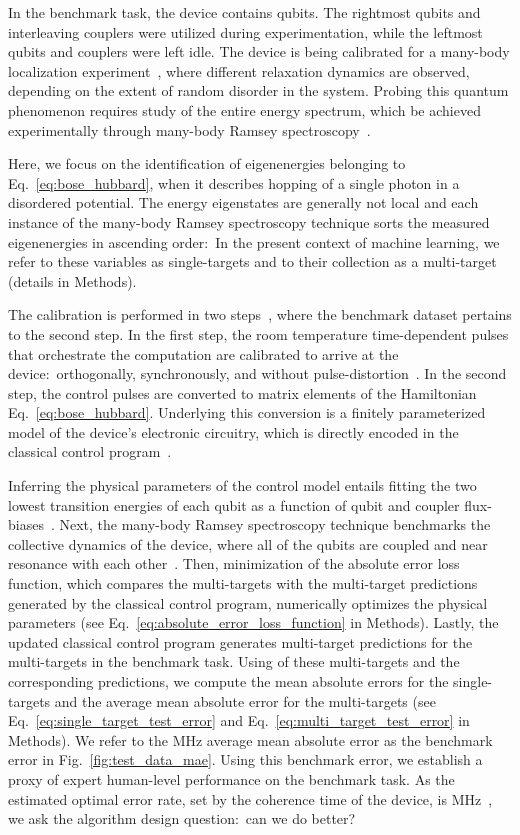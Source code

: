 \documentclass[aps,twocolumn,superscriptaddress,floatfix,preprintnumbers,showkeys]{revtex4}
\begin{document}
In the benchmark task, the device contains  qubits. The  rightmost qubits and  interleaving couplers were utilized during experimentation, while the  leftmost qubits and couplers were left idle. The device is being calibrated for a many-body localization experiment~\cite{Roushan_2017, Chiaro_2019}, where different relaxation dynamics are observed, depending on the extent of random disorder in the system. Probing this quantum phenomenon requires study of the entire energy spectrum, which be achieved experimentally through many-body Ramsey spectroscopy~\cite{Roushan_2017}. 

Here, we focus on the identification of  eigenenergies belonging to Eq.~\ref{eq:bose_hubbard}, when it describes hopping of a single photon in a disordered potential. The energy eigenstates are generally not local and each instance of the many-body Ramsey spectroscopy technique sorts the measured eigenenergies in ascending order:\  In the present context of machine learning, we refer to these variables as single-targets and to their collection as a multi-target (details in Methods). 

The calibration is performed in two steps~\cite{Roushan_2017, Neill_2018, Chiaro_2019}, where the benchmark dataset pertains to the second step. In the first step, the room temperature time-dependent pulses that orchestrate the computation are calibrated to arrive at the device:\ orthogonally, synchronously, and without pulse-distortion~\cite{Neill_2018}. In the second step, the control pulses are converted to matrix elements of the Hamiltonian Eq.~\ref{eq:bose_hubbard}. Underlying this conversion is a finitely parameterized model of the device's electronic circuitry, which is directly encoded in the classical control program~\cite{Roushan_2017, Neill_2018, Chiaro_2019}. 

Inferring the physical parameters of the control model entails fitting the two lowest transition energies of each qubit as a function of qubit and coupler flux-biases~\cite{Neill_2018}. Next, the many-body Ramsey spectroscopy technique benchmarks the collective dynamics of the device, where all of the qubits are coupled and near resonance with each other~\cite{Roushan_2017, Chiaro_2019}. Then, minimization of the absolute error loss function, which compares the multi-targets with the multi-target predictions generated by the classical control program, numerically optimizes the physical parameters (see Eq.~\ref{eq:absolute_error_loss_function} in Methods). Lastly, the updated classical control program generates  multi-target predictions for the  multi-targets in the benchmark task. Using  of these multi-targets and the corresponding predictions, we compute the mean absolute errors for the single-targets and the average mean absolute error for the multi-targets (see Eq.~\ref{eq:single_target_test_error} and Eq.~\ref{eq:multi_target_test_error} in Methods). We refer to the  MHz average mean absolute error as the benchmark error in Fig.~\ref{fig:test_data_mae}. Using this benchmark error, we establish a proxy of expert human-level performance on the benchmark task. As the estimated optimal error rate, set by the coherence time of the device, is MHz~\cite{Roushan_2017}, we ask the algorithm design question:\ can we do better? 
\end{document}
